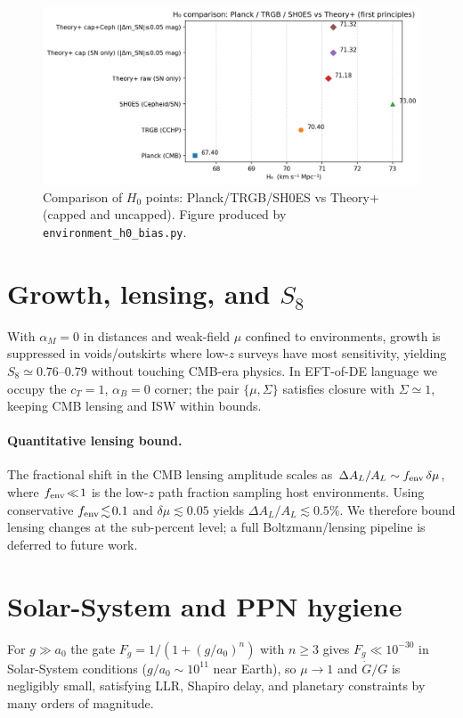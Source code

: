 \documentclass[aps,prd,preprint,onecolumn,longbibliography,nofootinbib]{revtex4-2}
\theoremstyle{plain}
\theoremstyle{remark}
\newcommand{\Hzero}{H_0}
\newcommand{\alM}{\alpha_{\!M}}
\newcommand{\alB}{\alpha_{\!B}}
\newcommand{\Sig}{\Sigma} %
\begin{document}
\begin{figure}[t]
  \centering
  \includegraphics[width=0.9\linewidth]{./outputs_paper_ready/H0_points_theoryplus.png}
  \caption{Comparison of $\Hzero$ points: Planck/TRGB/SH0ES vs Theory+ (capped and uncapped). Figure produced by \texttt{environment\_h0\_bias.py}.}
\end{figure}

\section{Growth, lensing, and \texorpdfstring{$S_8$}{S8}}\label{sec:lensing_closure}
With $\alM=0$ in distances and weak-field $\mu$ confined to environments, growth is suppressed in voids/outskirts where low-$z$ surveys have most sensitivity, yielding $S_8 \simeq 0.76$–$0.79$ without touching CMB-era physics. In EFT-of-DE language we occupy the $c_T\!=\!1$, $\alB\!=\!0$ corner; the pair $\{\mu,\Sig\}$ satisfies closure with $\Sig\simeq 1$, keeping CMB lensing and ISW within bounds.

\paragraph*{Quantitative lensing bound.} The fractional shift in the CMB lensing amplitude scales as $\Delta A_L/A_L \sim f_{\rm env}\,\delta\mu$, where $f_{\rm env}\!\ll\!1$ is the low-$z$ path fraction sampling host environments. Using conservative $f_{\rm env}\!\lesssim\!0.1$ and $\delta\mu\!\lesssim\!0.05$ yields $\Delta A_L/A_L\!\lesssim\!0.5\%$. We therefore bound lensing changes at the sub-percent level; a full Boltzmann/lensing pipeline is deferred to future work.

\section{Solar-System and PPN hygiene}
For $g\!\gg\! a_0$ the gate $F_g=1/(1+(g/a_0)^n)$ with $n\!\ge\!3$ gives $F_g\!\ll\!10^{-30}$ in Solar-System conditions ($g/a_0\!\sim\!10^{11}$ near Earth), so $\mu\!\to\!1$ and $\dot G/G$ is negligibly small, satisfying LLR, Shapiro delay, and planetary constraints by many orders of magnitude.
\end{document}
